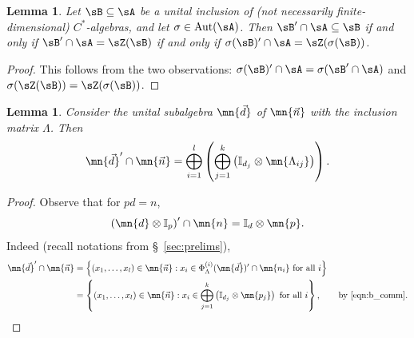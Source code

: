 \documentclass[12pt,a4paper]{amsart}
\theoremstyle{plain}
\newtheorem{lem}[theorem]{Lemma}
\theoremstyle{definition}
\theoremstyle{remark}
\numberwithin{equation}{section}
\theoremstyle{ser}
\theoremstyle{serr}
\theoremstyle{ser}
\theoremstyle{ser}
\theoremstyle{collabquestion}
\newcommand{\<}{\langle}
\renewcommand{\>}{\rangle}
\begin{document}
\begin{lem}\label{lem:rel_comm_invariance}
    Let $\sB \subseteq \sA$ be a unital inclusion of (not necessarily finite-dimensional) $C^*$-algebras, and let $\sigma \in \textrm{Aut}(\sA)$. Then  $\sB ' \cap \sA \subseteq \sB$ if and only if $\sB'\cap \sA = \sZ ( \sB)$ if and only if $\sigma(\sB)' \cap \sA = \sZ(\sigma(\sB))$.
\end{lem}
\begin{proof}
    This follows from the two observations: $\sigma(\sB)'\cap \sA = \sigma(\sB' \cap \sA)$ and $\sigma(\sZ(\sB)) = \sZ(\sigma(\sB))$.
\end{proof}


\begin{lem}\label{lem:rel_com}
    Consider the unital subalgebra $\mn{\vec{d}}$ of $\mn{\vec{n}}$ with the inclusion matrix $\Lambda$. Then
    \[
    \mn{\vec{d}}' \cap \mn{\vec{n}} = \bigoplus_{i=1}^{l} \left( \bigoplus_{j=1}^k \left( \mathbb{I}_{d_j} \otimes \mn{\Lambda_{ij}} \right) \right).
    \]
\end{lem}
\begin{proof} Observe that for $pd = n$,
    \begin{equation}\label{eqn:b_comm}
         \left( \mn{d} \otimes \mathbb{I}_{p} \right)' \cap \mn{n}
        =
            \mathbb{I}_{d} \otimes \mn{p}.
    \end{equation}
    Indeed (recall notations from \S~\ref{sec:prelims}),
    \begin{align*}
    \mn{\vec{d}}' \cap \mn{\vec{n}}
    &= \left\{ (x_1, \dots, x_l) \in \mn{\vec{n}} :
    x_i \in \Phi_\Lambda^{(i)}(\mn{\vec{d}})' \cap \mn{n_i}
    \text{ for all } i \right\} \\
    &= \left\{ (x_1, \dots, x_l) \in \mn{\vec{n}} :
    x_i \in \bigoplus_{j=1}^k
    \left( \mathbb{I}_{d_j} \otimes \mn{p_j} \right)
    \text{ for all } i \right\},
    \qquad \text{by \eqref{eqn:b_comm}}.
    \end{align*}
\end{proof}
\end{document}
